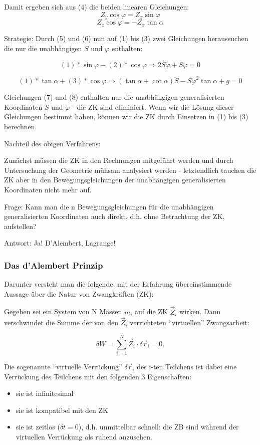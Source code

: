 \documentclass[10pt, letterpaper]{article}
\begin{document}
Damit ergeben sich aus (4) die beiden linearen Gleichungen:
\[Z_y \cos\varphi = Z_x \sin\varphi \tag{5}\]
\[Z_z \cos\varphi = -Z_x \tan\alpha \tag{6}\]

Strategie: Durch (5) und (6) nun auf (1) bis (3) zwei Gleichungen heraussuchen die nur die unabhängigen $S$ und $\varphi$ enthalten:

\[(1) * \sin\varphi - (2) * \cos\varphi \Rightarrow  2\dot{S}\dot{\varphi} + S\ddot{\varphi} = 0 \tag{7}\]

\[(1) * \tan\alpha + (3) * \cos\varphi \Rightarrow  (\tan\alpha + \cot\alpha)\ddot{S} - S\dot{\varphi}^2\tan\alpha + g = 0 \tag{8}\]

Gleichungen (7) und (8) enthalten nur die unabhängigen generalisierten Koordinaten $S$ und $\varphi$ - die ZK sind eliminiert. Wenn wir die Lösung dieser Gleichungen bestimmt haben, können wir die ZK durch Einsetzen in (1) bis (3) berechnen.

Nachteil des obigen Verfahrens:

Zunächst müssen die ZK in den Rechnungen mitgeführt werden und durch Untersuchung der Geometrie mühsam analysiert werden - letztendlich tauchen die ZK aber in den Bewegungsgleichungen der unabhängigen generalisierten Koordinaten nicht mehr auf.

Frage: Kann man die n Bewegungsgleichungen für die unabhängigen generalisierten Koordinaten auch direkt, d.h. ohne Betrachtung der ZK, aufstellen?

Antwort: Ja! D'Alembert, Lagrange!


\pagebreak

\subsubsection{Das d'Alembert Prinzip}

Darunter versteht man die folgende, mit der Erfahrung übereinstimmende Aussage über die Natur von Zwangkräften (ZK):

Gegeben sei ein System von N Massen $m_i$ auf die ZK $\vec{Z}_i$ wirken. Dann verschwindet die Summe der von den $\vec{Z}_i$ verrichteten ``virtuellen'' Zwangsarbeit:

\[
\delta W = \sum_{i=1}^N \vec{Z}_i \cdot \delta\vec{r}_i = 0.
\]

Die sogenannte ``virtuelle Verrückung'' $\delta\vec{r}_i$ des i-ten Teilchens ist dabei eine Verrückung des Teilchens mit den folgenden 3 Eigenschaften:
\begin{itemize}
\item sie ist infinitesimal
\item sie ist kompatibel mit den ZK
\item sie ist zeitlos ($\delta t=0$), d.h. unmittelbar schnell: die ZB sind während der virtuellen Verrückung als ruhend anzusehen.
\end{itemize}
\end{document}
